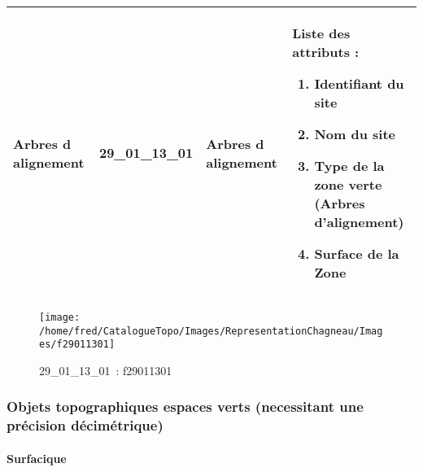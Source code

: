\documentclass[12pt,titlepage]{book}
\begin{document}
\renewcommand{\arraystretch}{1.2}
\begin{supertabular}{|p{10cm}|c|p{13cm}|p{12cm}|}
 Arbres d alignement & 29\_01\_13\_01 & Arbres d alignement & Liste des attributs :
\begin{enumerate}
  \item Identifiant du site  \item Nom du site  \item Type de la zone verte (Arbres d'alignement)  \item Surface de la Zone\end{enumerate}
\\
\hline
\end{supertabular}
\begin{figure}[h!]
  \hfill         %
  \begin{minipage}[t]{3cm}
    \begin{center}
      \texttt{[image: /home/fred/CatalogueTopo/Images/RepresentationChagneau/Images/f29011301]}
      \caption[~29\_01\_13\_01]{\small{29\_01\_13\_01~:} \tiny{f29011301}}\label{f29011301}
    \end{center}
  \end{minipage}
\end{figure}

\subsubsection{\large Objets topographiques espaces verts (necessitant une précision décimétrique)}
\paragraph{Surfacique}
\noindent
\vspace{\baselineskip}
\end{document}
